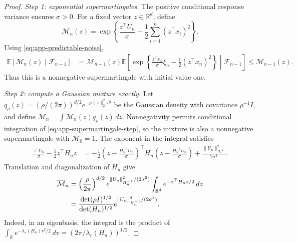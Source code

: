 \documentclass[10pt,twoside,letterpaper]{article}
\newcommand{\R}{\mathbb R}
\newcommand{\E}{\mathbb E}
\newcommand{\norm}[1]{\lVert #1\rVert}
\begin{document}
\begin{proof}
\textit{Step 1: exponential supermartingales.}
The positive conditional response variance ensures $\sigma>0$.
For a fixed vector $z\in\R^d$, define
\begin{equation}
\mathcal M_n(z)=\exp\!\left\{
 \frac{z^\top U_n}{\sigma}
 -\frac12\sum_{i=1}^n(z^\top x_i)^2\right\}.
\label{eq:app-fixed-exponential}
\end{equation}
Using \eqref{eq:app-predictable-noise},
\begin{align}
\E[\mathcal M_n(z)\mid\mathscr F_{n-1}]
&=\mathcal M_{n-1}(z)
\E\!\left[\exp\!\left\{\frac{z^\top x_n}{\sigma}\xi_n
-\frac12(z^\top x_n)^2\right\}\middle|\mathscr F_{n-1}\right]
\le\mathcal M_{n-1}(z).
\label{eq:app-supermartingale-step}
\end{align}
Thus this is a nonnegative supermartingale with initial value one.

\textit{Step 2: compute a Gaussian mixture exactly.}
Let $q_\rho(z)=(\rho/(2\pi))^{d/2}e^{-\rho\norm{z}_2^2/2}$ be the
Gaussian density with covariance $\rho^{-1}I$, and define
$\overline{\mathcal M}_n=\int\mathcal M_n(z)q_\rho(z)\,dz$.
Nonnegativity permits conditional integration of
\eqref{eq:app-supermartingale-step}, so the mixture is also a
nonnegative supermartingale with $\overline{\mathcal M}_0=1$.
The exponent in the integral satisfies
\begin{align}
\frac{z^\top U_n}{\sigma}-\frac12z^\top H_nz
&=-\frac12\left(z-\frac{H_n^{-1}U_n}{\sigma}\right)^\top
 H_n\left(z-\frac{H_n^{-1}U_n}{\sigma}\right)
 +\frac{\norm{U_n}_{H_n^{-1}}^2}{2\sigma^2}.
\label{eq:app-mixture-square}
\end{align}
Translation and diagonalization of $H_n$ give
\begin{align}
\overline{\mathcal M}_n
&=\left(\frac\rho{2\pi}\right)^{d/2}
 e^{\norm{U_n}_{H_n^{-1}}^2/(2\sigma^2)}
 \int_{\R^d}e^{-z^\top H_nz/2}\,dz\notag\\
&=\frac{\det(\rho I)^{1/2}}{\det(H_n)^{1/2}}
 e^{\norm{U_n}_{H_n^{-1}}^2/(2\sigma^2)}.
\label{eq:app-mixture-evaluation}
\end{align}
Indeed, in an eigenbasis, the integral is the product of
$\int_\R e^{-\lambda_r(H_n)v^2/2}\,dv
=(2\pi/\lambda_r(H_n))^{1/2}$.


\end{proof}
\end{document}
